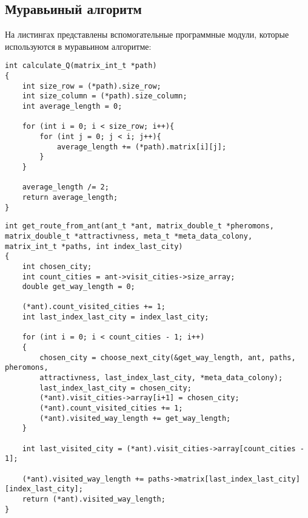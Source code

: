 \subsection{Муравьиный алгоритм}
На листингах представлены вспомогательные программные модули, которые используются в муравьином алгоритме:
\newpage
\begin{lstlisting}[label=Q_code, caption=Программный код вычисления параметра Q.]	
int calculate_Q(matrix_int_t *path)
{
	int size_row = (*path).size_row;
	int size_column = (*path).size_column;
	int average_length = 0;
	
	for (int i = 0; i < size_row; i++){
		for (int j = 0; j < i; j++){
			average_length += (*path).matrix[i][j];
		}
	}
	
	average_length /= 2;
	return average_length;
}
\end{lstlisting}

\begin{lstlisting}[label=get_route, caption=Программный код вычисления маршрута каждого муравья.]	
int get_route_from_ant(ant_t *ant, matrix_double_t *pheromons,
matrix_double_t *attractivness, meta_t *meta_data_colony,
matrix_int_t *paths, int index_last_city)
{
	int chosen_city;
	int count_cities = ant->visit_cities->size_array;
	double get_way_length = 0;

	(*ant).count_visited_cities += 1;
	int last_index_last_city = index_last_city;
	
	for (int i = 0; i < count_cities - 1; i++)
	{
		chosen_city = choose_next_city(&get_way_length, ant, paths, pheromons,
		attractivness, last_index_last_city, *meta_data_colony);
		last_index_last_city = chosen_city;
		(*ant).visit_cities->array[i+1] = chosen_city;
		(*ant).count_visited_cities += 1;
		(*ant).visited_way_length += get_way_length;
	}

	int last_visited_city = (*ant).visit_cities->array[count_cities - 1];

	(*ant).visited_way_length += paths->matrix[last_index_last_city][index_last_city];
	return (*ant).visited_way_length;
}
\end{lstlisting}

